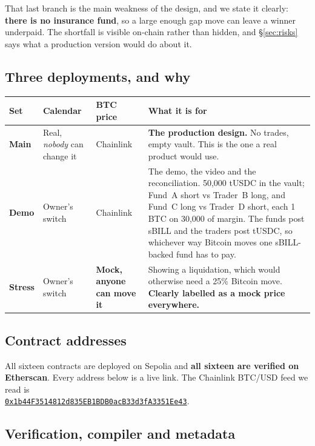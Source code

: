 \documentclass[11pt,a4paper]{article}
\newcommand{\ead}[1]{{\footnotesize\href{https://sepolia.etherscan.io/address/#1}{\nolinkurl{#1}}}}
\begin{document}
That last branch is the main weakness of the design, and we state it clearly: \textbf{there is no
insurance fund}, so a large enough gap move can leave a winner underpaid. The shortfall is visible
on-chain rather than hidden, and \S\ref{sec:risks} says what a production version would do about it.

\subsection{Three deployments, and why}\label{sec:calendars}

\begin{center}
\small
\begin{tabular}{@{}p{1.8cm}p{3.0cm}p{2.4cm}p{8.0cm}@{}}
\toprule
\textbf{Set} & \textbf{Calendar} & \textbf{BTC price} & \textbf{What it is for} \\
\midrule
\textbf{Main} & Real, \emph{nobody} can change it & Chainlink & \textbf{The production design.} No trades, empty vault. This is the one a real product would use. \\
\textbf{Demo} & Owner's switch & Chainlink & The demo, the video and the reconciliation. 50,000 tUSDC in the vault; Fund~A short vs Trader~B long, and Fund~C long vs Trader~D short, each 1 BTC on 30,000 of margin. The funds post sBILL and the traders post tUSDC, so whichever way Bitcoin moves one sBILL-backed fund has to pay. \\
\textbf{Stress} & Owner's switch & \textbf{Mock, anyone can move it} & Showing a liquidation, which would otherwise need a 25\% Bitcoin move. \textbf{Clearly labelled as a mock price everywhere.} \\
\bottomrule
\end{tabular}
\end{center}

\subsection{Contract addresses}\label{sec:addresses}

All sixteen contracts are deployed on Sepolia and \textbf{all sixteen are verified on Etherscan}.
Every address below is a live link. The Chainlink BTC/USD feed we read is\\
\ead{0x1b44F3514812d835EB1BDB0acB33d3fA3351Ee43}.



\subsection{Verification, compiler and metadata}\label{sec:metadata}
\end{document}
